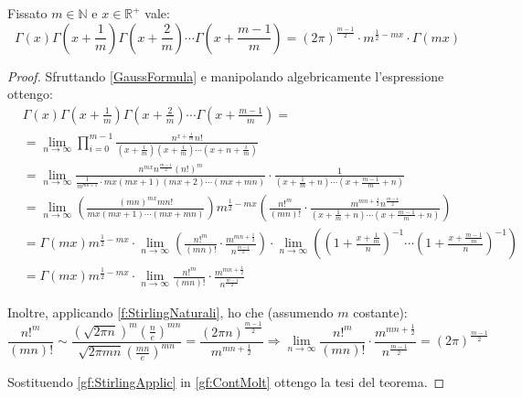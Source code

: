 \begin{theorem}\label{gf:Moltiplicazione}
	Fissato $m\in\mathbb{N}$ e $x\in\mathbb{R^+}$ vale:
	\begin{equation*}
		\Gamma(x)\Gamma\left(x+\frac 1m\right)\Gamma\left(x+\frac 2m\right)\cdots \Gamma\left(x+\frac {m-1}m\right)=
		(2\pi)^{\frac{m-1}2}\cdot m^{\frac12-mx}\cdot\Gamma(mx)
	\end{equation*}
\end{theorem}
\begin{proof}
	Sfruttando \cref{GaussFormula} e manipolando algebricamente l'espressione ottengo:
	\begin{equation}\begin{split}\label{gf:ContMolt}
		&\Gamma(x)\Gamma\left(x+\frac 1m\right)\Gamma\left(x+\frac 2m\right)\cdots \Gamma\left(x+\frac {m-1}m\right) =\\
		&=\lim_{n\to\infty} \prod_{i=0}^{m-1}\frac{n^{x+\frac im}n!}
		{\left(x+\frac im\right)\left(x+\frac im\right)\cdots \left(x+n+\frac im\right)}\\
		&=\lim_{n\to\infty}\frac{n^{mx}n^{\frac{m-1}2}(n!)^m}{\frac 1{m^{mn+1}}\cdot mx(mx+1)(mx+2)\cdots (mx+mn)}\cdot 
		\frac1 {\left(x+\frac 1m+n\right)\cdots \left(x+\frac {m-1}m+n\right)}\\
		&=\lim_{n\to\infty}\left(\frac{(mn)^{mx}mn!}{mx(mx+1)\cdots(mx+mn)}\right)m^{\frac12-mx}
		\left(\frac{n!^m}{(mn)!}\cdot\frac{m^{mn+\frac12}n^{\frac{m-1}2}}
		{\left(x+\frac 1m+n\right)\cdots \left(x+\frac {m-1}m+n\right)}\right)\\
		&=\Gamma(mx)m^{\frac12-mx} \cdot \lim_{n\to\infty} \left( \frac{n!^m}{(mn)!}\cdot 
		\frac{m^{mn+\frac12}}{n^{\frac{m-1}2}}\right)\cdot 
		\lim_{n\to\infty}\left( \left( 1+\frac{x+\frac{1}m}{n}\right)^{-1}
		\cdots \left( 1+\frac{x+\frac{m-1}m}{n}\right)^{-1}\right) \\
		&=\Gamma(mx)m^{\frac12-mx} \cdot \lim_{n\to\infty}\frac{n!^m}{(mn)!}\cdot \frac{m^{mn+\frac12}}{n^{\frac{m-1}2}}
	\end{split}\end{equation}
	
	Inoltre, applicando \cref{f:StirlingNaturali}, ho che (assumendo $m$ costante):
	\begin{equation}\label{gf:StirlingApplic}
		\frac{n!^m}{(mn)!}\sim\frac{\left(\sqrt{2\pi n}\right)^m\left(\frac ne\right)^{mn}}{\sqrt{2\pi mn}\left(\frac{mn}e\right)^{mn}}
		=\frac{(2\pi n)^{\frac{m-1}2}}{m^{mn+\frac12}}\Rightarrow 
		\lim_{n\to\infty}\frac{n!^m}{(mn)!}\cdot \frac{m^{mn+\frac12}}{n^{\frac{m-1}2}}=(2\pi)^{\frac{m-1}2}
	\end{equation}
	
	Sostituendo \cref{gf:StirlingApplic} in \cref{gf:ContMolt} ottengo la tesi del teorema.
\end{proof}

